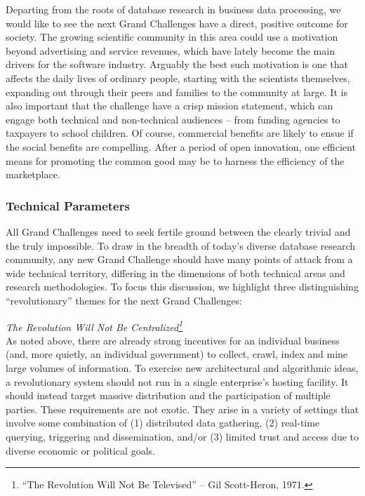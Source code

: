 \documentclass{acm_proc_article-sp}
\begin{document}
% 
Departing from the roots of database research in business data processing, we would like to see the next Grand Challenges have a direct, positive outcome for society. The growing scientific community in this area could use a motivation beyond advertising and service revenues, which have lately become the main drivers for the software industry. Arguably the best such motivation is one that affects the daily lives of ordinary people, starting with the scientists themselves, expanding out through their peers and families to the community at large. It is also important that the challenge have a crisp mission statement, which can engage both technical and non-technical audiences -- from funding agencies to taxpayers to school children. Of course, commercial benefits are likely to ensue if the social benefits are compelling. After a period of open innovation, one efficient means for promoting the common good may be to harness the efficiency of the marketplace.

\subsubsection{Technical Parameters} All Grand Challenges need to seek
fertile ground between the clearly trivial and the truly impossible. To
draw in the breadth of today's diverse database research community, any
new Grand Challenge should have many points of attack from a wide technical territory, differing in the dimensions of both technical areas and research methodologies. To focus this discussion, we highlight three distinguishing ``revolutionary'' themes for the next Grand Challenges:

 {\em The Revolution Will Not Be Centralized\footnote{``The Revolution Will Not Be Televised'' -- Gil Scott-Heron, 1971.}} \\
As noted above, there are already strong incentives for an individual business (and, more quietly, an individual government) to collect, crawl, index and mine large volumes of information. To exercise new architectural and algorithmic ideas, a revolutionary system should not run in a single enterprise's hosting facility. It should instead target massive distribution and the participation of multiple parties. These requirements are not exotic. They arise in a variety of settings that involve some combination of (1) distributed data gathering, (2) real-time querying, triggering and dissemination, and/or (3) limited trust and access due to diverse economic or political goals.
\end{document}
